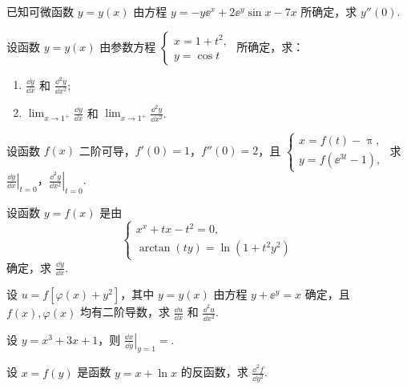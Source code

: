	\begin{ti}
		已知可微函数 $y = y(x)$ 由方程 $y = - y\ee^{x} + 2\ee^{y} \sin x - 7x$ 所确定，求 $y''(0)$.
	\end{ti}

	\begin{ti}
		设函数 $y = y(x)$ 由参数方程 $\begin{cases}
			x = 1 + t^{2},\\
			y = \cos t
		\end{cases}$ 所确定，求：
		\begin{enumerate}
			\item $\frac{\dd{y}}{\dd{x}}$ 和 $\frac{\dd^{2}y}{\dd{x^{2}}}$;
			\item $\lim_{x \to 1^{+}} \frac{\dd{y}}{\dd{x}}$ 和 $\lim_{x \to 1^{+}} \frac{\dd^{2}y}{\dd{x^{2}}}$.
		\end{enumerate}
	\end{ti}

	\begin{ti}
		设函数 $f(x)$ 二阶可导，$f'(0) = 1$，$f''(0) = 2$，且 $\begin{cases}
			x = f(t) - \uppi,\\
			y = f\left( \ee^{3t} - 1 \right),
		\end{cases}$ 求 $\left. \frac{\dd{y}}{\dd{x}} \right|_{t = 0}$，$\left. \frac{\dd^{2}y}{\dd{x^{2}}} \right|_{t = 0}$.
	\end{ti}

	\begin{ti}
		设函数 $y = f(x)$ 是由
		\[
			\begin{cases}
				x^{x} + tx - t^{2} = 0,\\
				\arctan(ty) = \ln\left( 1 + t^{2}y^{2} \right)
			\end{cases}
		\]
		确定，求 $\frac{\dd{y}}{\dd{x}}$.
	\end{ti}

	\begin{ti}
		设 $u = f\left[ \varphi(x) + y^{2} \right]$，其中 $y = y(x)$ 由方程 $y + \ee^{y} = x$ 确定，且 $f(x), \varphi(x)$ 均有二阶导数，求 $\frac{\dd{u}}{\dd{x}}$ 和 $\frac{\dd^{2}u}{\dd{x^{2}}}$.
	\end{ti}

	\begin{ti}
		设 $y = x^{3} + 3x + 1$，则 $\left. \frac{\dd{x}}{\dd{y}} \right|_{y = 1}=$\htwo.
	\end{ti}

	\begin{ti}
		设 $x = f(y)$ 是函数 $y = x + \ln x$ 的反函数，求 $\frac{\dd^{2}f}{\dd{y^{2}}}$.
	\end{ti}

